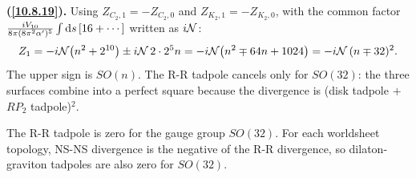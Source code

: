 \begin{tcolorbox}[breakable]
\begin{remark}
			\textbf{(\ref{10.8.19}).} Using $Z_{C_2,1}=-Z_{C_2,0}$ and $Z_{K_2,1}=-Z_{K_2,0}$, with the common factor $\frac{i V_{10}}{8\pi(8\pi^{2}\alpha')^{5}}\int\mathrm{d} s\,[16+\cdots]$ written as $i\mathcal N$:
			\begin{equation*}
				Z_1=-i\mathcal N\bigl(n^{2}+2^{10}\bigr)\pm i\mathcal N\,2\cdot2^{5}n=-i\mathcal N\bigl(n^{2}\mp64n+1024\bigr)=-i\mathcal N\,(n\mp32)^{2} .
			\end{equation*}
			The upper sign is $SO(n)$. The R-R tadpole cancels only for $SO(32)$: the three surfaces combine into a perfect square because the divergence is (disk tadpole $+$ $RP_2$ tadpole)$^{2}$.
		\end{remark}
	\end{tcolorbox}
	The R-R tadpole is zero for the gauge group $SO(32)$. For each worldsheet topology, NS-NS divergence is the negative of the R-R divergence, so dilaton-graviton tadpoles are also zero for $SO(32)$.